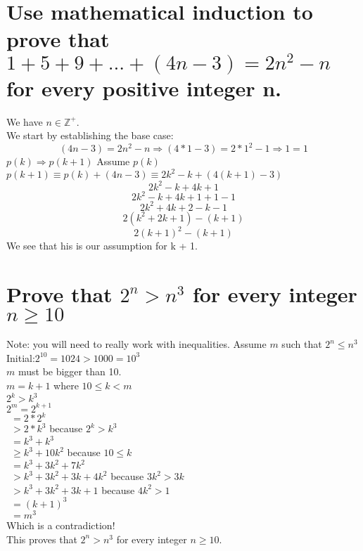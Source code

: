 \section{Use mathematical induction to prove that $1+5+9+...+(4n-3)=2n^2-n$ for every positive integer n.}
We have $n\in \mathbb{Z}^{+}$.\\
We start by establishing the base case:
\begin{equation}
(4n-3) = 2n^2-n \Rightarrow (4*1-3) = 2*1^2-1 \Rightarrow 1 = 1
\end{equation}
$p(k)\Rightarrow p(k+1)$
Assume $p(k)$\\
$p(k+1) \equiv p(k)+(4n-3) \equiv 2k^2-k+(4(k+1)-3)$\\
\begin{equation}
2k^2-k+4k+1
\end{equation}
\begin{equation}
2k^2-k+4k+1+1-1
\end{equation}
\begin{equation}
2k^2+4k+2-k-1
\end{equation}
\begin{equation}
2(k^2+2k+1)-(k+1)
\end{equation}
\begin{equation}
2(k+1)^2-(k+1)
\end{equation}
We see that his is our assumption for k + 1.{\Huge\Bat}


\section{Prove that $2^n>n^3$ for every integer $n\geq 10$}
Note: you will need to really work with inequalities.
Assume $m$ such that $2^n\leq n^3$\\
Initial:$2^{10}=1024 > 1000 = 10^3$\\
$m$ must be bigger than 10.\\
$m = k + 1$ where $10\leq k < m$\\
$2^k > k^3$\\
$2^m = 2^{k+1}$\\
$\ \ = 2*2^k$\\
$\ \ > 2*k^3$ because $2^k > k^3$\\
$\ \ = k^3+k^3$\\
$\ \ \geq k^3+10k^2$ because $10\leq k$\\
$\ \ =k^3+3k^2+7k^2$\\
$\ \ >k^3+3k^2+3k+4k^2$ because $3k^2 > 3k$\\
$\ \ >k^3+3k^2+3k+1$ because $4k^2 > 1$\\
$\ \ =(k+1)^3$\\
$\ \ =m^3$\\
Which is a contradiction!\\
This proves that $2^n > n^3$ for every integer $n\geq 10$.{\Huge\Bat}
